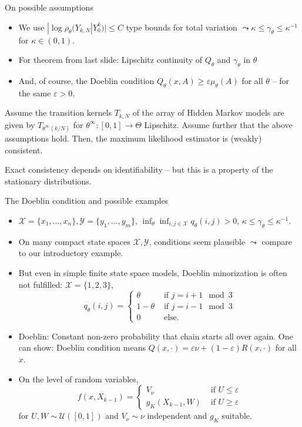 \begin{frame}{On possible assumptions}
	\begin{itemize}
\item We use $|\log \rho_\theta(Y_{k,N} | Y_{0}^k)| \leq C$ type bounds for total variation $\leadsto \kappa \leq  \gamma_{\theta} \leq \kappa^{-1}$ for $\kappa \in (0,1)$. 
\pause
\item For theorem from last slide: Lipschitz continuity of $Q_\theta$ and $\gamma_\theta$ in $\theta$
\item And, of course, the Doeblin condition $Q_\theta(x,A) \geq \varepsilon \mu_\theta(A)$ for all $\theta$ -- for the same $\varepsilon > 0$. 
\end{itemize}
\pause
\begin{theoremblock}
	Assume the transition kernels $T_{k,N}$ of the array of Hidden Markov models are given by $T_{\theta^\infty(k/N)}$ for $\theta^\infty: [0,1] \to \Theta$ Lipschitz. Assume further that the above assumptions hold. Then, the maximum likelihood estimator is (weakly) consistent. 
\end{theoremblock}
\pause
Exact consistency depends on identifiability -- but this is a property of the stationary distributions. 
\end{frame}

\begin{frame}{The Doeblin condition and possible examples}
	\begin{itemize}
		
		\item $\mathcal{X} = \{x_1, \ldots, x_n\}, \mathcal{Y} = \{y_1, \ldots, y_m\}$, $ \inf_\theta \inf_{i, j \in \mathcal{X}} q_\theta(i,j) > 0$, $\kappa \leq \gamma_\theta \leq \kappa^{-1}$. 
		\item On many compact state spaces $\mathcal{X}, \mathcal{Y}$, conditions seem plausible $\leadsto$ compare to our introductory example. \pause
		\item But even in simple finite state space models, Doeblin minorization is often not fulfilled: \small $\mathcal{X} = \{1,2,3\}$, \[q_{\theta}(i,j) = \begin{cases} \theta &\text{ if } j = i+1 \mod 3 \\ 1 - \theta &\text{ if } j = i-1  \mod 3 \\ 0 & \text{ else.} \end{cases}\]		
		\pause 
		\item Doeblin: Constant non-zero probability that chain starts all over again. \pause One can show: Doeblin condition means $
		Q(x,\cdot) = \varepsilon \nu + (1-\varepsilon) R(x,\cdot)$ for all $x$. \pause
		\item  On the level of random variables, \[
		f(x,X_{k-1}) = \begin{cases} V_\nu &\text{ if } U \leq \varepsilon \\ g_K(X_{k-1},W) &\text{ if } U \geq \varepsilon \end{cases}
		\] for $U,W \sim \mathcal{U}([0,1])$ and $V_\nu \sim \nu$ independent and $g_K$ suitable. 
	\end{itemize}
\end{frame}

